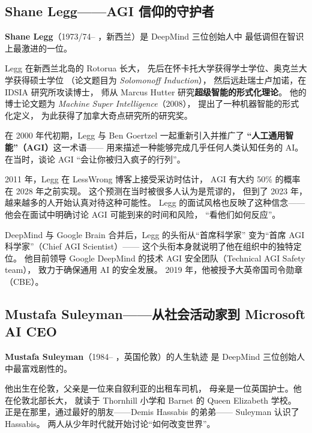 \subsection{Shane Legg——AGI 信仰的守护者}
\label{subsec:legg}

\noindent\textbf{Shane Legg}（1973/74-- ，新西兰）是 DeepMind 三位创始人中
最低调但在智识上最激进的一位。

Legg 在新西兰北岛的 Rotorua 长大，
先后在怀卡托大学获得学士学位、奥克兰大学获得硕士学位
（论文题目为 \textit{Solomonoff Induction}），
然后远赴瑞士卢加诺，在 IDSIA 研究所攻读博士，
师从 Marcus Hutter 研究\textbf{超级智能的形式化理论}。
他的博士论文题为 \textit{Machine Super Intelligence}（2008），
提出了一种机器智能的形式化定义，
为此获得了加拿大奇点研究所的研究奖。

在 2000 年代初期，Legg 与 Ben Goertzel 一起重新引入并推广了
\textbf{``人工通用智能''（AGI）}这一术语——
用来描述一种能够完成几乎任何人类认知任务的 AI。
在当时，谈论 AGI ``会让你被归入疯子的行列''。

\begin{corebox}
2011 年，Legg 在 LessWrong 博客上接受采访时估计，
AGI 有大约 50\% 的概率在 2028 年之前实现。
这个预测在当时被很多人认为是荒谬的，
但到了 2023 年，越来越多的人开始认真对待这种可能性。
Legg 的面试风格也反映了这种信念——
他会在面试中明确讨论 AGI 可能到来的时间和风险，
``看他们如何反应''。
\end{corebox}

DeepMind 与 Google Brain 合并后，Legg 的头衔从``首席科学家''
变为``首席 AGI 科学家''（Chief AGI Scientist）——
这个头衔本身就说明了他在组织中的独特定位。
他目前领导 Google DeepMind 的技术 AGI 安全团队（Technical AGI Safety team），
致力于确保通用 AI 的安全发展。
2019 年，他被授予大英帝国司令勋章（CBE）。


\subsection{Mustafa Suleyman——从社会活动家到 Microsoft AI CEO}
\label{subsec:suleyman}

\noindent\textbf{Mustafa Suleyman}（1984-- ，英国伦敦）的人生轨迹
是 DeepMind 三位创始人中最富戏剧性的。

他出生在伦敦，父亲是一位来自叙利亚的出租车司机，
母亲是一位英国护士。他在伦敦北部长大，
就读于 Thornhill 小学和 Barnet 的 Queen Elizabeth 学校。
正是在那里，通过最好的朋友——Demis Hassabis 的弟弟——
Suleyman 认识了 Hassabis。
两人从少年时代就开始讨论``如何改变世界''。

